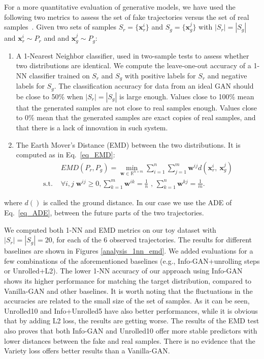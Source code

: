 \documentclass[10pt,twocolumn,letterpaper]{article}
\begin{document}
For a more quantitative evaluation of generative models, we have used the following two metrics to assess the set of fake trajectories versus the set of real samples~\cite{ganMetrics2018Xu}. Given two sets of samples $S_r=\{\mathbf{x}^i_r\}$ and $S_g=\{\mathbf{x}^j_g\}$ with $|S_r| = |S_g|$ and $\mathbf{x}^i_r \sim P_r$ and and $\mathbf{x}^j_g \sim P_g$:
\begin{enumerate}[leftmargin=*]
	\item A 1-Nearest Neighbor classifier, used in two-sample tests to assess whether two distributions are identical. We compute the leave-one-out accuracy of a 1-NN classifier trained on $S_r$ and $S_g$ with positive labels for $S_r$ and negative labels for $S_g$. The classification accuracy for data from an ideal GAN should be close to 50\% when $|S_r| = |S_g|$ is large enough. Values close to 100\% mean that the generated samples are not close to real samples enough. Values close to 0\% mean that the generated samples are exact copies of real samples, and that there is a lack of innovation in such system. 

	\item  The Earth Mover's Distance (EMD) between the two distributions. It is computed as in 
	Eq.~\ref{eq_EMD}:
	{\small
	\begin{equation}
	\begin{split}
	&EMD(P_r, P_g) = \min_{\mathbf w \in \mathbb{R}^{n \times m}}
	\sum_{i=1}^{n} \sum_{j=1}^{m}
	\mathbf w^{ij} d(\mathbf{x}^i_r, ~\mathbf{x}^j_g)		\\
	\mbox{s.t. } & \forall i,j \; \mathbf w^{ij} \geq 0, \sum_{k=1}^m \mathbf w^{ik} = \frac{1}{n} \mbox{ , }\sum_{k=1}^n \mathbf w^{kj} = \frac{1}{m}.
	\end{split}
	\label{eq_EMD}
	\end{equation}}
\end{enumerate}
where $d()$ is called the ground distance. In our case we use the ADE of Eq.~\ref{eq_ADE}, between the future parts of the two trajectories.

We computed both 1-NN and EMD metrics on our toy dataset with $|S_r| = |S_g| = 20$, for each of the 6 observed trajectories. The results for different baselines are shown in Figures \ref{analysis_1nn_emd}. We added evaluations for a few combinations of the aforementioned baselines (e.g., Info-GAN+unrolling steps or Unrolled+L2).
The lower 1-NN accuracy of our approach using Info-GAN shows its higher performance for matching the target distribution, compared to Vanilla-GAN and other baselines.  It is worth noting that the fluctuations in the accuracies are related to the small size of the set of samples. As it can be seen, Unrolled10 and Info+Unrolled5 have also better performances, while it is obvious that by adding L2 loss, the results are getting worse. The results of the EMD test also proves that both Info-GAN and Unrolled10 offer more stable predictors with lower distances between the fake and real samples. There is no evidence that the Variety loss offers better results than a Vanilla-GAN.
\end{document}
